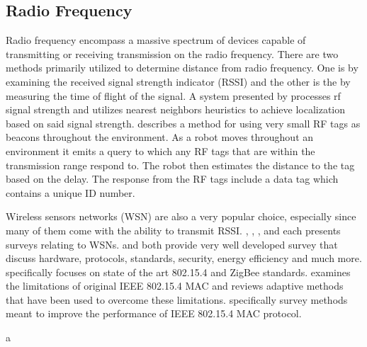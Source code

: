 \documentclass[conference]{IEEEtran}
\begin{document}
	\subsection{Radio Frequency}
	Radio frequency encompass a massive spectrum of devices capable of transmitting or receiving transmission on the radio frequency. There are two methods primarily utilized to determine distance from radio frequency. One is by examining the received signal strength indicator (RSSI) and the other is the by measuring the time of flight of the signal. A system presented by \cite{Padmanabhan2000} processes rf signal strength and utilizes nearest neighbors heuristics to achieve localization based on said signal strength.  \cite{Kurth2003a} describes a method for using very small RF tags as beacons throughout the environment.  As a robot moves throughout an environment it emits a query to which any RF tags that are within the transmission range respond to. The robot then estimates the distance to the tag based on the delay. The response from the RF tags include a data tag which contains a unique ID number. 
	
	Wireless sensors networks (WSN) are also a very popular choice, especially since many of them come with the ability to transmit RSSI. \cite{Baronti2007}, \cite{Khanafer2014}, \cite{Akyildiz2002}, and \cite{Xia2011} each presents surveys relating to WSNs.  \cite{Baronti2007} and \cite{Akyildiz2002} both provide very well developed survey that discuss hardware, protocols, standards, security, energy efficiency and much more. \cite{Baronti2007} specifically focuses on state of the art 802.15.4 and ZigBee standards. \cite{Xia2011} examines the limitations of original IEEE 802.15.4 MAC and reviews adaptive methods that have been used to overcome these limitations. \cite{Khanafer2014} specifically survey methods meant to improve the performance of IEEE 802.15.4 MAC protocol.




	
	
	
	
	a%
	
\end{document}

